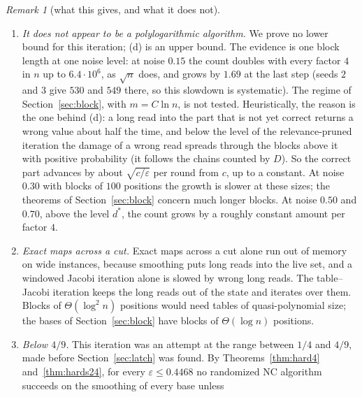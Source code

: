 \documentclass[11pt]{amsart}
\theoremstyle{definition}
\theoremstyle{remark}
\newtheorem{remark}[theorem]{Remark}
\newcommand{\eps}{\varepsilon}
\begin{document}
\begin{remark}[what this gives, and what it does not]
\begin{enumerate}[label=(\roman*),leftmargin=2.4em]
\noindent On the same instances the prefix--Jacobi iteration ($R=1$) takes $988$ and $3979$
applications at noise $0.15$ and $592$ and $1294$ at noise $0.30$, for $n=10^5$ and $4\cdot10^5$,
where there are $1000$ and $4000$ blocks. The chain $c_s$ of the proof of (d) has $152$, $394$,
$897$, $1939$ and $4139$ steps at noise $0.30$, so the iteration is $4$ to $24$ times faster than
that chain at these sizes, more at the larger ones. At noise $0.30$ and $n=1.6\cdot10^6$, blocks of $25$, $50$, $100$, $200$,
$400$ and $800$ positions (with $R$ twice the block length) give $66$, $75$, $96$, $109$, $94$ and
$83$ applications.
\item \emph{It does not appear to be a polylogarithmic algorithm.} We prove no lower bound for
this iteration; (d) is an upper bound. The evidence is one block length at one noise level: at
noise $0.15$ the count doubles with every factor $4$ in $n$ up to $6.4\cdot10^6$, as $\sqrt n$
does, and grows by $1.69$ at the last step (seeds $2$ and $3$ give $530$ and $549$ there, so this
slowdown is systematic). The regime of Section~\ref{sec:block}, with $m=C\ln n$, is not tested.
Heuristically, the reason is the one behind (d): a long read into the part that is not yet correct
returns a wrong value about half the time, and below the level of the relevance-pruned iteration
the damage of a wrong read spreads through the blocks above it with positive probability (it
follows the chains counted by $D$). So the correct part advances by about $\sqrt{c/\eps}$ per
round from $c$, up to a constant. At noise $0.30$ with blocks of $100$ positions the growth is slower at these
sizes; the theorems of Section~\ref{sec:block} concern much longer blocks. At noise $0.50$ and
$0.70$, above the level $d^*$, the count grows by a roughly constant amount per factor $4$.
\item \emph{Exact maps across a cut.} Exact maps across a cut alone run out of memory on wide
instances, because smoothing puts long reads into the live set, and a windowed Jacobi iteration
alone is slowed by wrong long reads. The table--Jacobi iteration keeps the long reads out of the
state and iterates over them. Blocks of $\Theta(\log^2n)$ positions would need tables of
quasi-polynomial size; the bases of Section~\ref{sec:block} have blocks of $\Theta(\log n)$
positions.
\item \emph{Below $4/9$.} This iteration was an attempt at the range between $1/4$ and $4/9$,
made before Section~\ref{sec:latch} was found. By Theorems~\ref{thm:hard4} and~\ref{thm:hards24},
for every $\eps\le0.4468$ no randomized NC algorithm succeeds on the smoothing of every base unless

\end{enumerate}
\end{remark}
\end{document}
